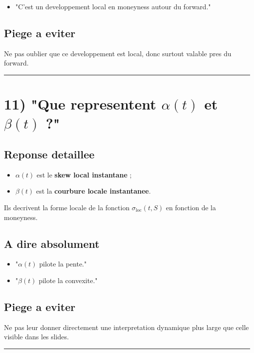 \documentclass[11pt,a4paper]{article}
\begin{document}
\begin{itemize}
\item "C'est un developpement local en moneyness autour du forward."
\end{itemize}

\subsection{Piege a eviter}

Ne pas oublier que ce developpement est local, donc surtout valable pres du forward.

\bigskip\hrule\bigskip

\section{11) "Que representent \(\alpha(t)\) et \(\beta(t)\) ?"}

\subsection{Reponse detaillee}

\begin{itemize}
\item \(\alpha(t)\) est le \textbf{skew local instantane} ;
\item \(\beta(t)\) est la \textbf{courbure locale instantanee}.
\end{itemize}

Ils decrivent la forme locale de la fonction \(\sigma_{\mathrm{loc}}(t,S)\) en fonction de la moneyness.

\subsection{A dire absolument}

\begin{itemize}
\item "\(\alpha(t)\) pilote la pente."
\item "\(\beta(t)\) pilote la convexite."
\end{itemize}

\subsection{Piege a eviter}

Ne pas leur donner directement une interpretation dynamique plus large que celle visible dans les slides.

\bigskip\hrule\bigskip
\end{document}
